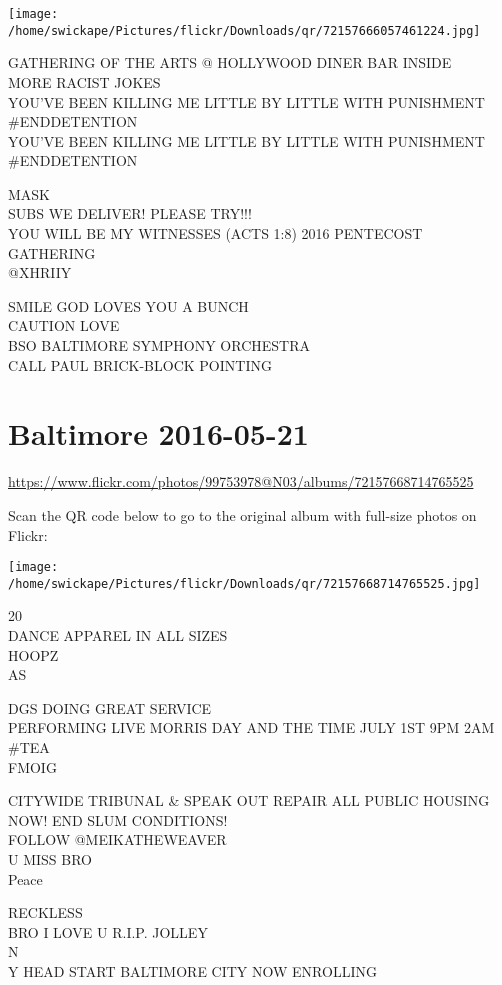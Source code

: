 \documentclass[10pt,letterpaper]{article}
\begin{document}
\texttt{[image: /home/swickape/Pictures/flickr/Downloads/qr/72157666057461224.jpg]}


GATHERING OF THE ARTS @ HOLLYWOOD DINER BAR INSIDE\\
MORE RACIST JOKES\\
YOU'VE BEEN KILLING ME LITTLE BY LITTLE WITH PUNISHMENT \#ENDDETENTION\\
YOU'VE BEEN KILLING ME LITTLE BY LITTLE WITH PUNISHMENT \#ENDDETENTION

MASK\\
SUBS WE DELIVER!  PLEASE TRY!!!\\
YOU WILL BE MY WITNESSES (ACTS 1:8) 2016 PENTECOST GATHERING\\
@XHRIIY

SMILE GOD LOVES YOU A BUNCH\\
CAUTION LOVE\\
BSO BALTIMORE SYMPHONY ORCHESTRA\\
CALL PAUL BRICK{-}BLOCK POINTING


\section*{Baltimore 2016-05-21}

\url{https://www.flickr.com/photos/99753978@N03/albums/72157668714765525}

Scan the QR code below to go to the original album with full-size photos on Flickr:

\texttt{[image: /home/swickape/Pictures/flickr/Downloads/qr/72157668714765525.jpg]}


20\\
DANCE APPAREL IN ALL SIZES\\
HOOPZ\\
AS

DGS DOING GREAT SERVICE\\
PERFORMING LIVE MORRIS DAY AND THE TIME JULY 1ST 9PM 2AM\\
\#TEA\\
FMOIG

CITYWIDE TRIBUNAL \& SPEAK OUT REPAIR ALL PUBLIC HOUSING NOW!  END SLUM CONDITIONS!\\
FOLLOW @MEIKATHEWEAVER\\
U MISS BRO\\
Peace

RECKLESS\\
BRO I LOVE U R.I.P. JOLLEY\\
N\\
Y HEAD START BALTIMORE CITY NOW ENROLLING
\end{document}
